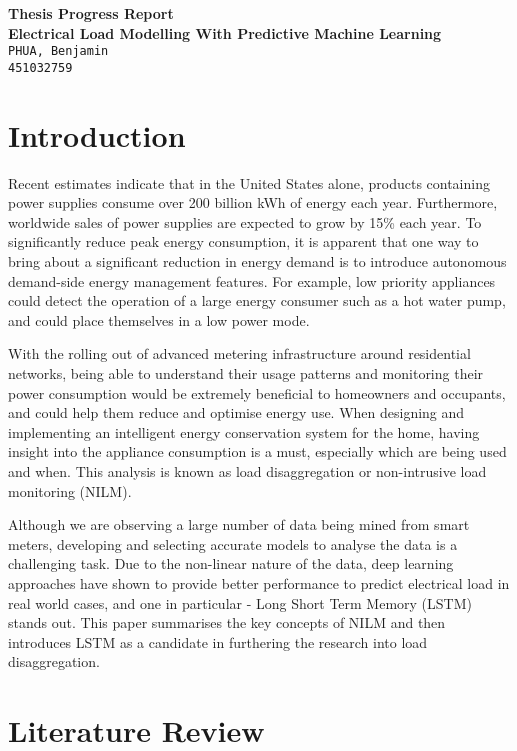 \documentclass[12pt,twocolumn]{article}
\begin{document}
	\begin{center}
		\textbf{\Large Thesis Progress Report} \\\vspace{4mm}
		\textbf{\Large Electrical Load Modelling With Predictive Machine Learning} \\\vspace{4mm}
		\texttt{PHUA, Benjamin\\451032759}
	\end{center}

	\section{Introduction}

		Recent estimates indicate that in the United States alone, products containing power supplies consume over 200 billion kWh of energy each year. Furthermore, worldwide sales of power supplies are expected to grow by 15\% each year. To significantly reduce peak energy consumption, it is apparent that one way to bring about a significant reduction in energy demand is to introduce autonomous demand-side energy management features. For example, low priority appliances could detect the operation of a large energy consumer such as a hot water pump, and could place themselves in a low power mode. 

		With the rolling out of advanced metering infrastructure around residential networks, being able to understand their usage patterns and monitoring their power consumption would be extremely beneficial to homeowners and occupants, and could help them reduce and optimise energy use. When designing and implementing an intelligent energy conservation system for the home, having insight into the appliance consumption is a must, especially which are being used and when. This analysis is known as load disaggregation or non-intrusive load monitoring (NILM). 

		Although we are observing a large number of data being mined from smart meters, developing and selecting accurate models to analyse the data is a challenging task. Due to the non-linear nature of the data, deep learning approaches have shown to provide better performance to predict electrical load in real world cases, and one in particular - Long Short Term Memory (LSTM) stands out. This paper summarises the key concepts of NILM and then introduces LSTM as a candidate in furthering the research into load disaggregation.

	\section{Literature Review}
\end{document}
